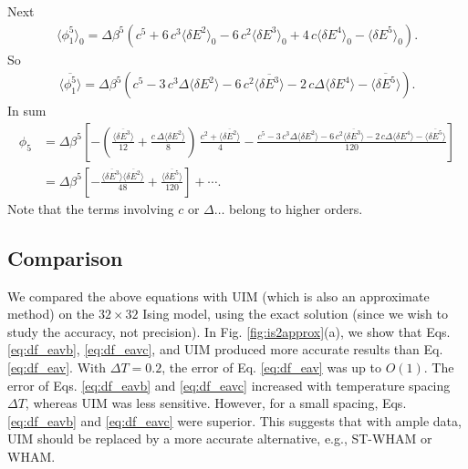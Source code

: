 \documentclass[aip,jcp,preprint,notitlepage, superscriptaddress]{revtex4-1}
\begin{document}
Next
\begin{align*}
\langle \phi_1^5 \rangle_0
=
\Delta \beta^5
\left(
c^5 + 6 \, c^3 \langle \delta E^2 \rangle_0
-6 \, c^2 \langle \delta E^3 \rangle_0
+4 \, c \langle \delta E^4 \rangle_0
-\langle \delta E^5 \rangle_0
\right).
\end{align*}
So
\begin{align*}
\overline{ \langle \phi_1^5 \rangle }
=
\Delta \beta^5
\left(
c^5
- 3 \, c^3 \Delta \langle \delta E^2 \rangle
-6 \, c^2 \overline{ \langle \delta E^3 \rangle }
-2 \, c \Delta \langle \delta E^4 \rangle
-\overline{ \langle \delta E^5 \rangle }
\right).
\end{align*}
In sum
\begin{align*}
\phi_5
&=
\Delta \beta^5
\left[
  -\left(
    \frac{ \overline{ \langle \delta E^3 \rangle } }
         { 12 }
    +
    \frac{ c \, \Delta \langle \delta E^2 \rangle }
         { 8 }
  \right)
\, \frac{ c^2 + \overline{ \langle \delta E^2 \rangle } }
        { 4 }
-\frac{
  c^5
  - 3 \, c^3 \Delta \langle \delta E^2 \rangle
  -6 \, c^2 \overline{ \langle \delta E^3 \rangle }
  -2 \, c \Delta \langle \delta E^4 \rangle
  -\overline{ \langle \delta E^5 \rangle }
} { 120 }
\right] \\
&=
\Delta \beta^5
\left[
  -\frac{ \overline{ \langle \delta E^3 \rangle }
          \overline{ \langle \delta E^2 \rangle } }
        { 48 }
+\frac{
  \overline{ \langle \delta E^5 \rangle }
} { 120 }
\right] + \cdots.
\end{align*}
%
Note that the terms involving $c$ or $\Delta \dots$
belong to higher orders.



\subsection{Comparison}


We compared the above equations
with UIM\cite{kastner2005, *kastner2009}
(which is also an approximate method)
on the $32\times 32$ Ising model,
%
using the exact solution\cite{
ferdinand1969}
(since we wish to study
the accuracy, not precision).
%
In Fig. \ref{fig:is2approx}(a),
we show that
Eqs. \eqref{eq:df_eavb},
\eqref{eq:df_eavc},
and UIM
produced more accurate results than
Eq. \eqref{eq:df_eav}.
%
With $\Delta T = 0.2$,
the error of Eq. \eqref{eq:df_eav}
was up to $O(1)$.
%
The error of
Eqs. \eqref{eq:df_eavb} and \eqref{eq:df_eavc}
increased with temperature spacing $\Delta T$,
whereas
UIM was less sensitive.
%
However, for a small spacing,
Eqs. \eqref{eq:df_eavb} and \eqref{eq:df_eavc}
were superior.
%
This suggests that with ample data,
UIM should be replaced
by a more accurate alternative, e.g., ST-WHAM or WHAM.
\end{document}
